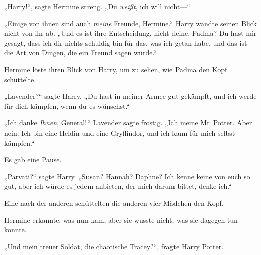 „Harry!“, sagte Hermine streng.
„Du \emph{weißt}, ich will nicht—“

„Einige von ihnen sind auch \emph{meine} Freunde, Hermine.“ Harry wandte seinen Blick nicht von ihr ab.
„Und es ist ihre Entscheidung, nicht deine. Padma? Du hast mir gesagt, dass ich dir nichts schuldig bin für das, was ich getan habe, und das ist die Art von Dingen, die ein Freund sagen würde.“

Hermine löste ihren Blick von Harry, um zu sehen, wie Padma den Kopf schüttelte.

„Lavender?“ sagte Harry.
„Du hast in meiner Armee gut gekämpft, und ich werde für dich kämpfen, wenn du es wünschst.“

„Ich danke \emph{Ihnen}, General!“ Lavender sagte frostig.
„Ich meine Mr~Potter. Aber nein. Ich bin eine Heldin und eine Gryffindor, und ich kann für mich selbst kämpfen.“

Es gab eine Pause.

„Parvati?“ sagte Harry.
„Susan? Hannah? Daphne? Ich kenne keine von euch so gut, aber ich würde es jedem anbieten, der mich darum bittet, denke ich.“

Eine nach der anderen schüttelten die anderen vier Mädchen den Kopf.

Hermine erkannte, was nun kam, aber sie wusste nicht, was sie dagegen tun konnte.

„Und mein treuer Soldat, die chaotische Tracey?“, fragte Harry Potter.

